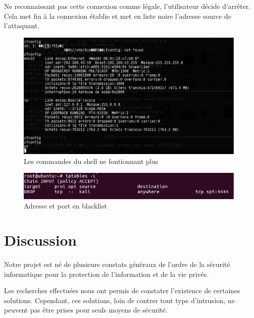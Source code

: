 				
		Ne reconnaissant pas cette connexion comme légale, l'utilisateur décide d'arrêter. Cela met fin à la connexion établie et met en liste noire l'adresse source de l'attaquant.
	
	\begin{figure}[H]
					\begin{center}
					    \includegraphics[scale=0.5]{images/session_notworking.png}
					\end{center}
					\caption{Les commandes du shell ne fontionnant plus}	
					\label{Les commandes du shell ne fontionnant plus}
				    \end{figure}
				    
				    
				    \begin{figure}[H]
					\begin{center}
					    \includegraphics[scale=0.5]{images/iptables_success.png}
					\end{center}
					\caption{Adresse et port en blacklist}	
					\label{Blacklist}
				    \end{figure}
	\section{Discussion}
			\paragraph{}
				Notre projet est né de plusieurs constats généraux de l'ordre de la sécurité informatique pour la protection de l'information et de la vie privée.
				
				 Les recherches effectuées nous ont permis de constater l'existence de certaines solutions. Cependant, ces solutions, loin de contrer tout type d'intrusion, ne peuvent pas être prises pour seuls moyens de sécurité.
